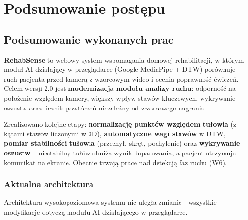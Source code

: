 \documentclass[11pt,a4paper]{article}
\newcommand{\sysname}{\textbf{RehabSense}}
\begin{document}
\section{Podsumowanie postępu}

\subsection{Podsumowanie wykonanych prac}

\sysname{} to webowy system wspomagania domowej rehabilitacji, w którym moduł AI działający w przeglądarce (Google MediaPipe + DTW) porównuje ruch pacjenta przed kamerą z wzorcowym wideo i ocenia poprawność ćwiczeń. Celem wersji 2.0 jest \textbf{modernizacja modułu analizy ruchu}: odporność na położenie względem kamery, większy wpływ stawów kluczowych, wykrywanie oszustw oraz licznik powtórzeń niezależny od wzorcowego nagrania.

Zrealizowano kolejne etapy: \textbf{normalizację punktów względem tułowia} (z kątami stawów liczonymi w 3D), \textbf{automatyczne wagi stawów} w DTW, \textbf{pomiar stabilności tułowia} (przechył, skręt, pochylenie) oraz \textbf{wykrywanie oszustw} -- niestabilny tułów obniża wynik dopasowania, a pacjent otrzymuje komunikat na ekranie. Obecnie trwają prace nad detekcją faz ruchu (W6).

\subsubsection*{Aktualna architektura}
Architektura wysokopoziomowa systemu nie uległa zmianie - wszystkie modyfikacje dotyczą modułu AI działającego w przeglądarce.
\end{document}

